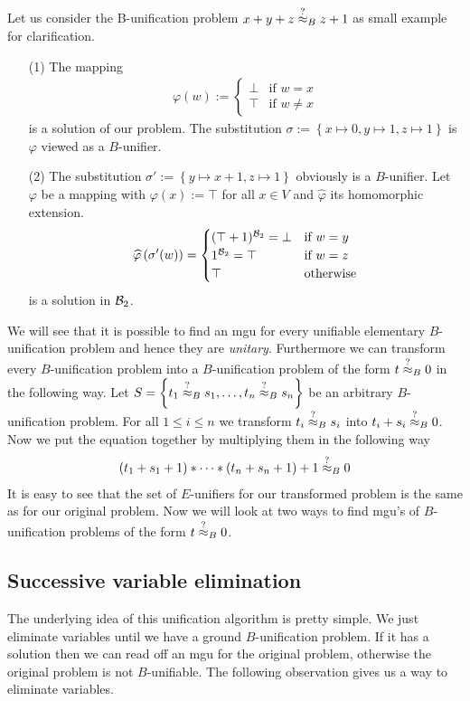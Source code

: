 	Let us consider the B-unification problem $x+y+z\stackrel{?}{\approx}_B z+1$ as small example for clarification.
	\begin{itemize}
		\item[(1)]The mapping 
		      \begin{align*}
		      	\varphi(w):=\begin{cases}
		      	\bot & \text{if }w=x     \\
		      	\top & \text{if }w\neq x 
		      	\end{cases}
		      \end{align*}is a solution of our problem. The substitution $\sigma:=\left\lbrace x\mapsto0,y\mapsto1,z\mapsto1\right\rbrace$ is $\varphi$ viewed as a $B$-unifier.
		\item[(2)]The substitution $\sigma':=\left\lbrace y\mapsto x+1,z\mapsto 1\right\rbrace $ obviously is a $B$-unifier. Let $\varphi$ be a mapping with $\varphi(x):=\top$ for all $x\in V$ and $\widehat{\varphi}$ its homomorphic extension.
		      \begin{align*}
		      	\widehat{\varphi}\left(\sigma'(w)\right)=\begin{cases}
		      	(\top+1)^{\mathcal{B}_2}=\bot & \text{if } w=y   \\
		      	1^{\mathcal{B}_2}=\top        & \text{if } w=z   \\
		      	\top                & \text{otherwise} 
		      	\end{cases}
		      \end{align*}
		      is a solution in ${\mathcal{B}_2}$.
	\end{itemize}
	We will see that it is possible to find an mgu for every unifiable elementary $B$-unification problem and hence they are \emph{unitary}.
	Furthermore we can transform every $B$-unification problem into a $B$-unification problem of the form $t\stackrel{?}{\approx}_B0$ in the following way. Let $S=\left\lbrace t_1\stackrel{?}{\approx}_Bs_1,\dots,t_n\stackrel{?}{\approx}_Bs_n\right\rbrace$ be an arbitrary $B$-unification problem. For all $1\leq i\leq n$ we transform $t_i\stackrel{?}{\approx}_Bs_i$ into $t_i+s_i\stackrel{?}{\approx}_B0$. Now we put the equation together by multiplying them in the following way 
	\begin{align*}
		(t_1+s_1+1)*\dots*(t_n+s_n+1)+1\stackrel{?}{\approx}_B0 
	\end{align*}
	It is easy to see that the set of $E$-unifiers for our transformed problem is the same as for our original problem. Now we will look at two ways to find mgu's of $B$-unification problems of the form $t\stackrel{?}{\approx}_B0$.
	\subsection{Successive variable elimination}
	The underlying idea of this unification algorithm is pretty simple. We just eliminate variables until we have a ground $B$-unification problem. If it has a solution then we can read off an mgu for the original problem, otherwise the original problem is not $B$-unifiable. The following observation gives us a way to eliminate variables.
			
